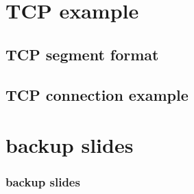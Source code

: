 

\section{TCP example}

\subsection{TCP segment format}


%

\subsection{TCP connection example}




\section{backup slides}
\begin{frame}\frametitle{backup slides}
\end{frame}


